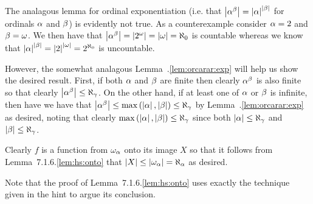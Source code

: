 \begin{solution}
    The analagous lemma for ordinal exponentiation (i.e. that $\left| \alpha^\beta \right| = \left| \alpha \right|^{\left| \beta \right|}$ for ordinals $\alpha$ and $\beta$) is evidently not true.
    As a counterexample consider $\alpha = 2$ and $\beta = \omega$.
    We then have that $\left| \alpha^\beta \right| = \left| 2^\omega \right| = \left| \omega \right| = \aleph_0$ is countable whereas we know that $\left| \alpha \right|^{\left| \beta \right|} = \left| 2 \right|^{\left| \omega \right|} = 2^{\aleph_0}$ is uncountable.

    However, the somewhat analagous Lemma~\ex.\ref{lem:orcarar:exp} will help us show the desired result.
    First, if both $\alpha$ and $\beta$ are finite then clearly $\alpha^\beta$ is also finite so that clearly $\left| \alpha^\beta \right| \leq \aleph_\gamma$.
    On the other hand, if at least one of $\alpha$ or $\beta$ is infinite, then have we have that $\left| \alpha^\beta \right| \leq \max\left( \left| \alpha \right|, \left| \beta \right| \right) \leq \aleph_\gamma$ by Lemma~\ex.\ref{lem:orcarar:exp} as desired, noting that clearly $\max\left( \left| \alpha \right|, \left| \beta \right| \right) \leq \aleph_\gamma$ since both $\left| \alpha \right| \leq \aleph_\gamma$ and $\left| \beta \right| \leq \aleph_\gamma$. \qedsymbol
\end{solution}

\begin{solution}
	Clearly $f$ is a function from $\omega_\alpha$ onto its image $X$ so that it follows from Lemma~7.1.6.\ref{lem:hs:onto} that $\left| X \right| \leq \left| \omega_\alpha \right| = \aleph_\alpha$ as desired. \qedsymbol
    
    Note that the proof of Lemma~7.1.6.\ref{lem:hs:onto} uses exactly the technique given in the hint to argue its conclusion.
\end{solution}


